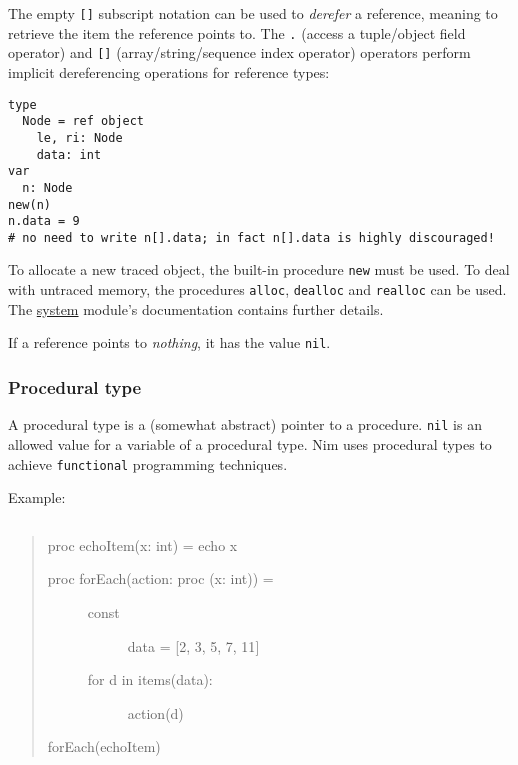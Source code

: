 The empty \texttt{{[}{]}} subscript notation can be used to
\emph{derefer} a reference, meaning to retrieve the item the reference
points to. The \texttt{.} (access a tuple/object field operator) and
\texttt{{[}{]}} (array/string/sequence index operator) operators perform
implicit dereferencing operations for reference types:

\begin{verbatim}
type
  Node = ref object
    le, ri: Node
    data: int
var
  n: Node
new(n)
n.data = 9
# no need to write n[].data; in fact n[].data is highly discouraged!
\end{verbatim}

To allocate a new traced object, the built-in procedure \texttt{new}
must be used. To deal with untraced memory, the procedures
\texttt{alloc}, \texttt{dealloc} and \texttt{realloc} can be used. The
\href{system.html}{system} module's documentation contains further
details.

If a reference points to \emph{nothing}, it has the value \texttt{nil}.

\hypertarget{procedural-type}{%
\subsubsection{Procedural type}\label{procedural-type}}

A procedural type is a (somewhat abstract) pointer to a procedure.
\texttt{nil} is an allowed value for a variable of a procedural type.
Nim uses procedural types to achieve \texttt{functional} programming
techniques.

Example:

\begin{verbatim}
\end{verbatim}

\begin{quote}
proc echoItem(x: int) = echo x

\begin{description}
\item[proc forEach(action: proc (x: int)) =]
\begin{description}
\item[const]
data = {[}2, 3, 5, 7, 11{]}
\item[for d in items(data):]
action(d)
\end{description}
\end{description}

forEach(echoItem)
\end{quote}

